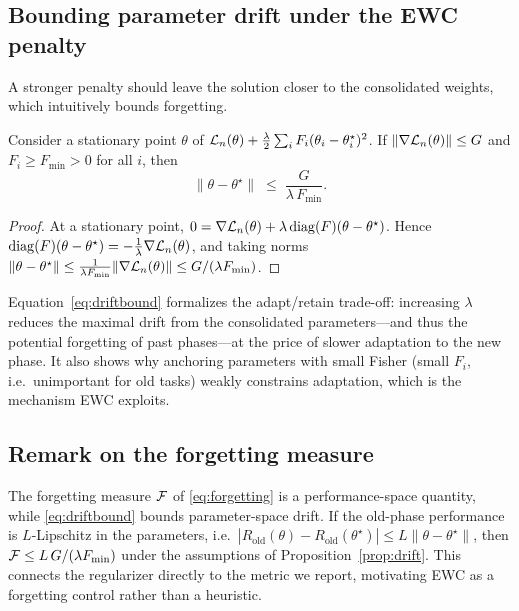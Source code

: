 \subsection{Bounding parameter drift under the EWC penalty}
A stronger penalty should leave the solution closer to the consolidated weights,
which intuitively bounds forgetting.

\begin{proposition}
\label{prop:drift}
Consider a stationary point \(\theta\) of
\(\mathcal{L}_n(\theta)+\frac{\lambda}{2}\sum_i F_i(\theta_i-\theta^\star_i)^2\). If
\(\|\nabla\mathcal{L}_n(\theta)\|\le G\) and \(F_i\ge F_{\min}>0\) for all \(i\), then
\begin{equation}
  \|\theta-\theta^\star\| \;\le\; \frac{G}{\lambda\,F_{\min}}.
  \label{eq:driftbound}
\end{equation}
\end{proposition}
\begin{proof}
At a stationary point, \(0=\nabla\mathcal{L}_n(\theta)+\lambda\,\mathrm{diag}(F)(\theta-\theta^\star)\).
Hence \(\mathrm{diag}(F)(\theta-\theta^\star)=-\frac{1}{\lambda}\nabla\mathcal{L}_n(\theta)\),
and taking norms
\(\|\theta-\theta^\star\|\le\frac{1}{\lambda F_{\min}}\|\nabla\mathcal{L}_n(\theta)\|\le G/(\lambda F_{\min})\).
\end{proof}
Equation~\eqref{eq:driftbound} formalizes the adapt/retain trade-off: increasing
\(\lambda\) reduces the maximal drift from the consolidated parameters---and thus
the potential forgetting of past phases---at the price of slower adaptation to the
new phase. It also shows why anchoring parameters with small Fisher (small
\(F_i\), i.e.\ unimportant for old tasks) weakly constrains adaptation, which is
the mechanism EWC exploits.

\subsection{Remark on the forgetting measure}
The forgetting measure \(\mathcal{F}\) of \eqref{eq:forgetting} is a
performance-space quantity, while \eqref{eq:driftbound} bounds parameter-space
drift. If the old-phase performance is \(L\)-Lipschitz in the parameters, i.e.\
\(|R_{\text{old}}(\theta)-R_{\text{old}}(\theta^\star)|\le L\|\theta-\theta^\star\|\),
then \(\mathcal{F} \le L\,G/(\lambda F_{\min})\) under the assumptions of
Proposition~\ref{prop:drift}. This connects the regularizer directly to the
metric we report, motivating EWC as a forgetting control rather than a heuristic.
